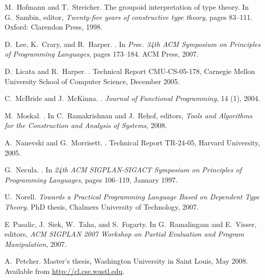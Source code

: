 \documentclass[9pt,natbib]{sigplanconf}
\begin{document}
\begin{thebibliography}{28}
M.~Hofmann and T.~Streicher.
\newblock The groupoid interpretation of type theory.
\newblock In G.~Sambin, editor, \emph{Twenty-five years of constructive type
  theory}, pages 83--111. Oxford: Clarendon Press, 1998.

D.~Lee, K.~Crary, and R.~Harper.
.
\newblock In \emph{{Proc. 34th ACM Symposium on Principles of Programming
  Languages}}, pages 173--184. ACM Press, 2007.

D.~Licata and R.~Harper.
.
\newblock Technical Report CMU-CS-05-178, {Carnegie Mellon University School of
  Computer Science}, December 2005.

\vfill\eject

C.~McBride and J.~McKinna.
.
\newblock \emph{Journal of Functional Programming}, 14 (1), 2004.

M.~Moskal.
.
\newblock In C.~Ramakrishnan and J.~Rehof, editors, \emph{Tools and Algorithms
  for the Construction and Analysis of Systems}, 2008.

A.~Nanevski and G.~Morrisett.
.
\newblock Technical Report TR-24-05, Harvard University, 2005.

G.~Necula.
.
\newblock In \emph{24th ACM SIGPLAN-SIGACT Symposium on Principles of
  Programming Languages}, pages 106--119, January 1997.

U.~Norell.
\newblock \emph{{Towards a Practical Programming Language Based on Dependent
  Type Theory}}.
\newblock PhD thesis, {Chalmers University of Technology}, 2007.

E~Pasalic, J.~Siek, W.~Taha, and S.~Fogarty.
\newblock In G.~Ramalingam and E.~Visser, editors, \emph{ACM SIGPLAN 2007
  Workshop on Partial Evaluation and Program Manipulation}, 2007.

A.~Petcher.
\newblock Master's thesis, {Washington University in Saint Louis}, May 2008.
\newblock Available from \url{http://cl.cse.wustl.edu}.


\end{thebibliography}
\end{document}
